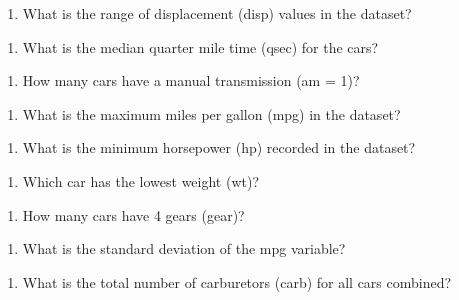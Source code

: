 \documentclass[
  letterpaper,
  DIV=11,
  numbers=noendperiod]{scrreprt}
\providecommand{\tightlist}{%
  \setlength{\itemsep}{0pt}\setlength{\parskip}{0pt}}\usepackage{longtable,booktabs,array}
\begin{document}
\begin{enumerate}
\def\labelenumi{\arabic{enumi}.}
\setcounter{enumi}{8}
\tightlist
\item
  What is the range of displacement (disp) values in the dataset?
\end{enumerate}

\begin{enumerate}
\def\labelenumi{\arabic{enumi}.}
\setcounter{enumi}{9}
\tightlist
\item
  What is the median quarter mile time (qsec) for the cars?
\end{enumerate}

\begin{enumerate}
\def\labelenumi{\arabic{enumi}.}
\setcounter{enumi}{10}
\tightlist
\item
  How many cars have a manual transmission (am = 1)?
\end{enumerate}

\begin{enumerate}
\def\labelenumi{\arabic{enumi}.}
\setcounter{enumi}{11}
\tightlist
\item
  What is the maximum miles per gallon (mpg) in the dataset?
\end{enumerate}

\begin{enumerate}
\def\labelenumi{\arabic{enumi}.}
\setcounter{enumi}{12}
\tightlist
\item
  What is the minimum horsepower (hp) recorded in the dataset?
\end{enumerate}

\begin{enumerate}
\def\labelenumi{\arabic{enumi}.}
\setcounter{enumi}{13}
\tightlist
\item
  Which car has the lowest weight (wt)?
\end{enumerate}

\begin{enumerate}
\def\labelenumi{\arabic{enumi}.}
\setcounter{enumi}{14}
\tightlist
\item
  How many cars have 4 gears (gear)?
\end{enumerate}

\begin{enumerate}
\def\labelenumi{\arabic{enumi}.}
\setcounter{enumi}{15}
\tightlist
\item
  What is the standard deviation of the mpg variable?
\end{enumerate}

\begin{enumerate}
\def\labelenumi{\arabic{enumi}.}
\setcounter{enumi}{16}
\tightlist
\item
  What is the total number of carburetors (carb) for all cars combined?
\end{enumerate}
\end{document}
